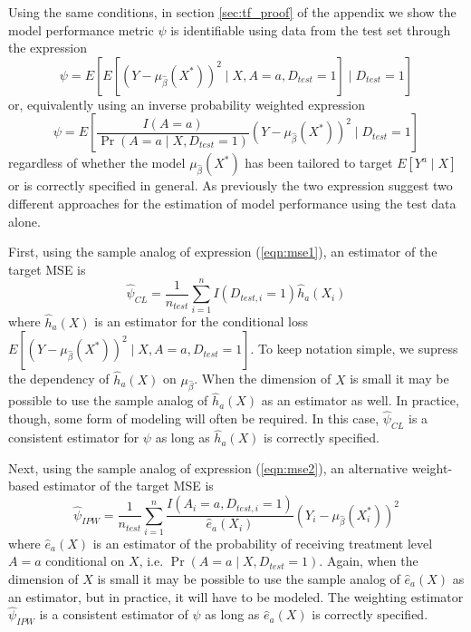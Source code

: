 Using the same conditions, in section \ref{sec:tf_proof} of the appendix we show the model performance metric $\psi$ is identifiable using data from the test set through the expression
\begin{equation}\label{eqn:mse1}
    \psi = E\left[E[(Y - \mu_{\widehat{\beta}}(X^*))^2 \mid X, A=a, D_{test} = 1] \mid D_{test} = 1\right]
\end{equation}
or, equivalently using an inverse probability weighted expression 
\begin{equation}\label{eqn:mse2}
    \psi = E\left[\frac{I(A = a)}{\Pr(A = a \mid X, D_{test} = 1)}(Y - \mu_{\widehat{\beta}}(X^*))^2 \mid D_{test} = 1\right]
\end{equation}
regardless of whether the model $\mu_{\widehat{\beta}}(X^*)$ has been tailored to target $E[Y^a \mid X]$ or is correctly specified in general. 
As previously the two expression suggest two different approaches for the estimation of model performance using the test data alone. 

First, using the sample analog of expression (\ref{eqn:mse1}), an estimator of the target MSE is 
\begin{equation}\label{eqn:cl_estimator}
    \widehat{\psi}_{CL} = \frac{1}{n_{test}} \sum_{i=1}^nI(D_{test, i} = 1)\widehat{h}_a(X_i)
\end{equation}
where $\widehat{h}_a(X)$ is an estimator for the conditional loss $E[(Y - \mu_{\widehat{\beta}}(X^*))^2 \mid X, A=a, D_{test} = 1]$. To keep notation simple, we supress the dependency of $\widehat{h}_a(X)$ on $\mu_{\widehat{\beta}}$. When the dimension of $X$ is small it may be possible to use the sample analog of $\widehat{h}_a(X)$ as an estimator as well. In practice, though, some form of modeling will often be required. In this case, $\widehat{\psi}_{CL}$ is a consistent estimator for $\psi$ as long as $\widehat{h}_a(X)$ is correctly specified.

Next, using the sample analog of expression (\ref{eqn:mse2}), an alternative weight-based estimator of the target MSE is 
\begin{equation}\label{eqn:ipw_estimator}
    \widehat{\psi}_{IPW} = \frac{1}{n_{test}} \sum_{i=1}^n \frac{I(A_i = a, D_{test, i} = 1)}{\widehat{e}_a(X_i)}(Y_i - \mu_{\widehat{\beta}}(X^*_i))^2
\end{equation}
where $\widehat{e}_a(X)$ is an estimator of the probability of receiving treatment level $A = a$ conditional on $X$, i.e. $\Pr(A = a \mid X, D_{test} = 1)$. Again, when the dimension of $X$ is small it may be possible to use the sample analog of $\widehat{e}_a(X)$ as an estimator, but in practice, it will have to be modeled. The weighting estimator $\widehat{\psi}_{IPW}$ is a consistent estimator of $\psi$ as long as $\widehat{e}_a(X)$ is correctly specified.

